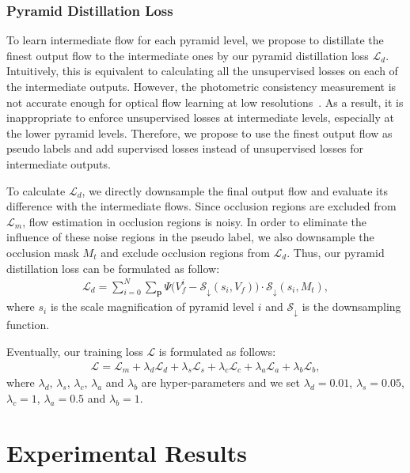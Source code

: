 \documentclass[final]{cvpr}
\begin{document}
\subsubsection{Pyramid Distillation Loss}\label{sec:algo_pyramid_distillation_loss}
To learn intermediate flow for each pyramid level, we propose to distillate the finest output flow to the intermediate ones by our pyramid distillation loss $\mathcal{L}_{d}$.
Intuitively, this is equivalent to calculating all the unsupervised losses on each of the intermediate outputs. However, the photometric consistency measurement is not accurate enough for optical flow learning at low resolutions~\cite{jonschkowski2020matters}. As a result, it is inappropriate to enforce unsupervised losses at intermediate levels, especially at the lower pyramid levels. Therefore, we propose to use the finest output flow as pseudo labels and add supervised losses instead of unsupervised losses for intermediate outputs. 

To calculate $\mathcal{L}_{d}$, we directly downsample the final output flow and evaluate its difference with the intermediate flows. Since occlusion regions are excluded from $\mathcal{L}_m$, flow estimation in occlusion regions is noisy. In order to eliminate the influence of these noise regions in the pseudo label, we also downsample the occlusion mask $M_t$ and exclude occlusion regions from $\mathcal{L}_{d}$. Thus, our pyramid distillation loss can be formulated as follow:
\begin{eqnarray}\label{eq:pyramid-distillation-loss}
	\mathcal{L}_{d} = \sum_{i=0}^{N} \sum_{\bm{p}}\Psi\big(V_{f}^{i}-\mathcal{S}_{\downarrow}(s_i,V_{f})\big) \cdot \mathcal{S}_{\downarrow}(s_i, M_{t}), 
\end{eqnarray}
where $s_i$ is the scale magnification of pyramid level $i$ and $\mathcal{S}_{\downarrow}$ is the downsampling function. 

Eventually, our training loss $\mathcal{L}$ is formulated as follows: 
\begin{eqnarray}\label{eq:total-training-loss}
	\mathcal{L}=\mathcal{L}_m+\lambda_d\mathcal{L}_d + \lambda_s\mathcal{L}_s + \lambda_c\mathcal{L}_c + \lambda_a\mathcal{L}_a + \lambda_b\mathcal{L}_b, 
\end{eqnarray}
where $\lambda_d$, $\lambda_s$, $\lambda_c$, $\lambda_a$ and $\lambda_b$ are hyper-parameters and we set $\lambda_d=0.01$, $\lambda_s=0.05$, $\lambda_c=1$, $\lambda_a=0.5$ and $\lambda_b=1$. 


\section{Experimental Results}\label{sec:results}
\end{document}
